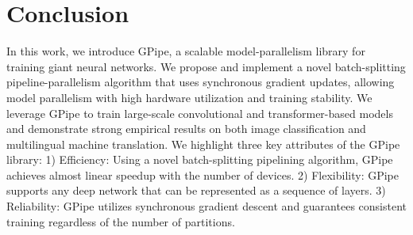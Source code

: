 \documentclass{article}
\def\codename{GPipe}
\begin{document}
\section{Conclusion}
In this work, we introduce \codename{}, a scalable model-parallelism library for training giant neural networks. We propose and implement a novel batch-splitting pipeline-parallelism algorithm that uses synchronous gradient updates, allowing model parallelism with high hardware utilization and training stability. We leverage \codename{} to train large-scale convolutional and transformer-based models and demonstrate strong empirical results on both image classification and multilingual machine translation. We highlight three key attributes of the \codename{} library: 1) Efficiency: Using a novel batch-splitting pipelining algorithm, \codename{} achieves almost linear speedup with the number of devices. 2) Flexibility: \codename{} supports any deep network that can be represented as a sequence of layers. 3) Reliability: \codename{} utilizes synchronous gradient descent and guarantees consistent training regardless of the number of partitions. 
\end{document}
